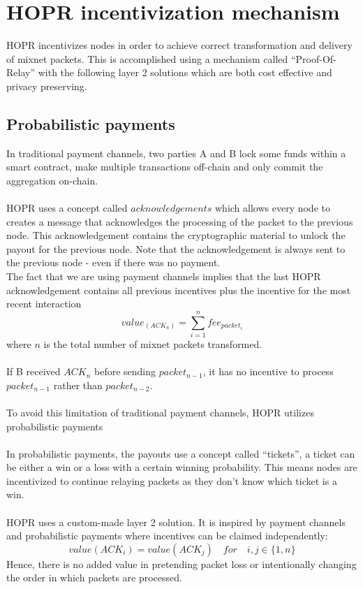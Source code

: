 \section{HOPR incentivization mechanism}
HOPR incentivizes nodes in order to achieve correct transformation and delivery of mixnet packets.
This is accomplished using a mechanism called “Proof-Of-Relay” with the following layer 2 solutions which are both cost effective and privacy preserving.

\subsection{Probabilistic payments}
In traditional payment channels, two parties A and B lock some funds within a smart contract, make multiple transactions off-chain and only commit the aggregation on-chain.
\\~\\HOPR uses a concept called $acknowledgements$ which allows every node to creates a message that acknowledges the processing of the packet to the previous node. This acknowledgement contains the cryptographic material to unlock the payout for the previous node. Note that the acknowledgement is always sent to the previous node - even if there was no payment.
\\The fact that we are using payment channels implies that the last HOPR acknowledgement contains all previous incentives plus the incentive for the most recent interaction
$$value_(ACK_n) =\sum_{i=1}^nfee_{packet_i}$$ where $n$ is the total number of mixnet packets transformed.
\\~\\If B received $ACK_n$ before sending $packet_{n-1}$, it has no incentive to process $packet_{n-1}$ rather than $packet_{n-2}$.
\\~\\To avoid this limitation of traditional payment channels, HOPR utilizes probabilistic payments
\\~\\In probabilistic payments, the payouts use a concept called “tickets”, a ticket can be either a win or a loss with a certain winning probability. This means nodes are incentivized to continue relaying packets as they don’t know which ticket is a win.
\\~\\HOPR uses a custom-made layer 2 solution. It is inspired by payment channels and probabilistic payments where incentives can be claimed independently:
$$value ( ACK_i )=value ( ACK_j ) \quad for \quad i,j\in \{1,n\}$$
Hence, there is no added value in pretending packet loss or intentionally changing the order in which packets are processed.
